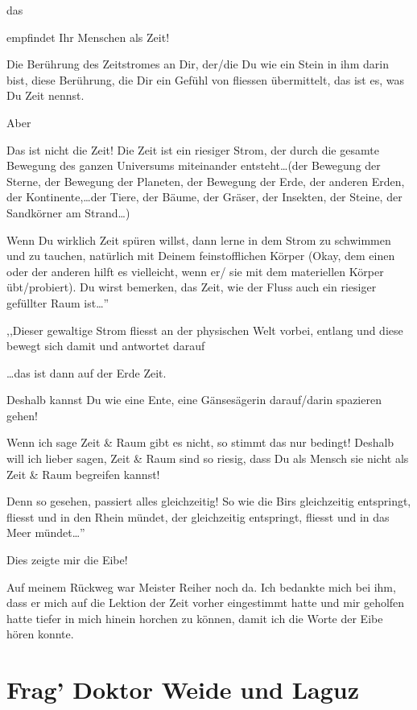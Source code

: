 \documentclass[11pt,titlepage,a5paper]{book}
\begin{document}
das

empfindet Ihr Menschen als Zeit!

Die Berührung des Zeitstromes an Dir, der/die Du wie ein Stein in ihm darin bist, diese Berührung, die Dir ein Gefühl von fliessen übermittelt, das ist es, was Du Zeit nennst.

Aber

Das ist nicht die Zeit! Die Zeit ist ein riesiger Strom, der durch die gesamte Bewegung des ganzen Universums miteinander entsteht\dots (der Bewegung der Sterne, der Bewegung der Planeten, der Bewegung der Erde, der anderen Erden, der Kontinente,\dots der Tiere, der Bäume, der Gräser, der Insekten, der Steine, der Sandkörner am Strand\dots )

Wenn Du wirklich Zeit spüren willst, dann lerne in dem Strom zu schwimmen und zu tauchen, natürlich mit Deinem feinstofflichen Körper (Okay, dem einen oder der anderen hilft es vielleicht, wenn er/ sie mit dem materiellen Körper übt/probiert). Du wirst bemerken, das Zeit, wie der Fluss auch ein riesiger gefüllter Raum ist\dots ''

,,Dieser gewaltige Strom fliesst an der physischen Welt vorbei, entlang und diese bewegt sich damit und antwortet darauf

\dots das ist dann auf der Erde Zeit.

Deshalb kannst Du wie eine Ente, eine Gänsesägerin darauf/darin spazieren gehen!

Wenn ich sage Zeit \& Raum gibt es nicht, so stimmt das nur bedingt! Deshalb will ich lieber sagen, Zeit \& Raum sind so riesig, dass Du als Mensch sie nicht als Zeit \& Raum begreifen kannst!

Denn so gesehen, passiert alles gleichzeitig! So wie die Birs gleichzeitig entspringt, fliesst und in den Rhein mündet, der gleichzeitig entspringt, fliesst und in das Meer mündet\dots ''

Dies zeigte mir die Eibe!

Auf meinem Rückweg war Meister Reiher noch da. Ich bedankte mich bei ihm, dass er mich auf die Lektion der Zeit vorher eingestimmt hatte und mir geholfen hatte tiefer in mich hinein horchen zu können, damit ich die Worte der Eibe hören konnte.





\section{Frag' Doktor Weide und Laguz  }
\end{document}
